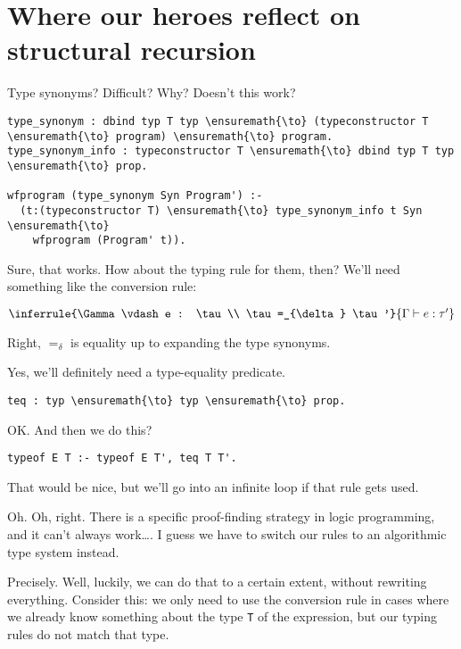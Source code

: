 \section{Where our heroes reflect on structural
recursion}\label{where-our-heroes-reflect-on-structural-recursion}

\heroSTUDENT{} Type synonyms? Difficult? Why? Doesn't this work?

\begin{verbatim}
type_synonym : dbind typ T typ \ensuremath{\to} (typeconstructor T \ensuremath{\to} program) \ensuremath{\to} program.
type_synonym_info : typeconstructor T \ensuremath{\to} dbind typ T typ \ensuremath{\to} prop.

wfprogram (type_synonym Syn Program') :-
  (t:(typeconstructor T) \ensuremath{\to} type_synonym_info t Syn \ensuremath{\to}
    wfprogram (Program' t)).
\end{verbatim}

\heroADVISOR{} Sure, that works. How about the typing rule for them, then?
We'll need something like the conversion rule:

\begin{center}$\inferrule{\Gamma \vdash e : \tau \\ \tau =_{\delta} \tau'}{\Gamma \vdash e : \tau'}$\end{center}

\heroSTUDENT{} Right, \(=_{\delta}\) is equality up to expanding the type
synonyms.

\heroADVISOR{} Yes, we'll definitely need a type-equality predicate.

\begin{verbatim}
teq : typ \ensuremath{\to} typ \ensuremath{\to} prop.
\end{verbatim}

\heroSTUDENT{} OK. And then we do this?

\begin{verbatim}
typeof E T :- typeof E T', teq T T'.
\end{verbatim}

\heroADVISOR{} That would be nice, but we'll go into an infinite loop if that
rule gets used.

\heroSTUDENT{} Oh. Oh, right. There is a specific proof-finding strategy in
logic programming, and it can't always work\ldots{}. I guess we have to
switch our rules to an algorithmic type system instead.

\heroADVISOR{} Precisely. Well, luckily, we can do that to a certain extent,
without rewriting everything. Consider this: we only need to use the
conversion rule in cases where we already know something about the type
\texttt{T} of the expression, but our typing rules do not match that
type.


